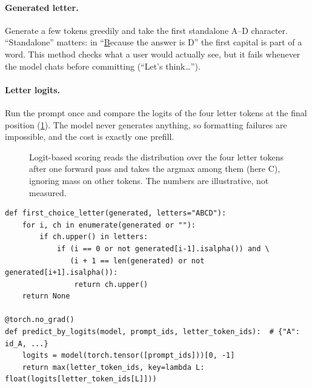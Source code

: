\paragraph{Generated letter.} Generate a few tokens greedily and take the first standalone A--D
character. ``Standalone'' matters: in ``\underline{B}ecause the answer is D'' the first capital is
part of a word. This method checks what a user would actually see, but it fails whenever the
model chats before committing (``Let's think\dots'').

\paragraph{Letter logits.} Run the prompt once and compare the logits of the four letter tokens at
the final position (\cref{fig:eval:mcqlogits}). The model never generates anything, so formatting
failures are impossible, and the cost is exactly one prefill.

\begin{figure}[t]
\centering
{}
\caption{Logit-based scoring reads the distribution over the four letter tokens after one
forward pass and takes the argmax among them (here C), ignoring mass on other tokens. The numbers
are illustrative, not measured.}
\label{fig:eval:mcqlogits}
\end{figure}

\begin{lstlisting}[caption={Two ways to read a multiple-choice prediction.},label={lst:eval:mcqread}]
def first_choice_letter(generated, letters="ABCD"):
    for i, ch in enumerate(generated or ""):
        if ch.upper() in letters:
            if (i == 0 or not generated[i-1].isalpha()) and \
               (i + 1 == len(generated) or not generated[i+1].isalpha()):
                return ch.upper()
    return None

@torch.no_grad()
def predict_by_logits(model, prompt_ids, letter_token_ids):  # {"A": id_A, ...}
    logits = model(torch.tensor([prompt_ids]))[0, -1]
    return max(letter_token_ids, key=lambda L: float(logits[letter_token_ids[L]]))
\end{lstlisting}

